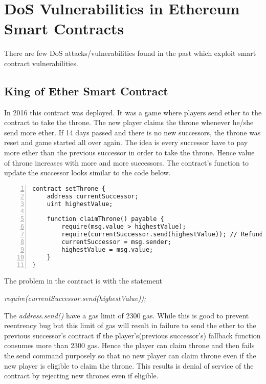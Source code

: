 \chapter{DoS Vulnerabilities in Ethereum Smart Contracts}
\label{ch:DosVul}
There are few DoS attacks/vulnerabilities found in the past which exploit smart contract vulnerabilities\cite{knownattacks}\cite{kattack}.
\section{King of Ether Smart Contract\cite{koet}}
In 2016 this contract was deployed. It was a game where players send ether to the contract to take the throne. The new player claims the throne whenever he/she send more ether. If 14 days passed and there is no new successors, the throne was reset and game started all over again. The idea is every successor have to pay more ether than the previous successor in order to take the throne. Hence value of throne increases with more and more successors\cite{pomzigame}. The contract's function to update the successor looks similar to the code below.

\begin{Verbatim}[numbers=left,xleftmargin=5mm]
contract setThrone {
    address currentSuccessor;
    uint highestValue;
    
    function claimThrone() payable {
        require(msg.value > highestValue);
        require(currentSuccessor.send(highestValue)); // Refund the old Successor else revert
        currentSuccessor = msg.sender;
        highestValue = msg.value;
    }
}
\end{Verbatim}
The problem in the contract is with the statement
\begin{center}
    \emph{require(currentSuccessor.send(highestValue));}
\end{center}

\noindent The \emph{address.send()} have a gas limit of 2300 gas. While this is good to prevent reentrency bug but this limit of gas will result in failure to send the ether to the previous successor's contract if the player's(previous successor's) fallback function consumes more than 2300 gas. Hence the player can claim throne and then fails the send command purposely so that no new player can claim throne even if the new player is eligible to claim the throne. This results is denial of service of the contract by rejecting new thrones even if eligible.
